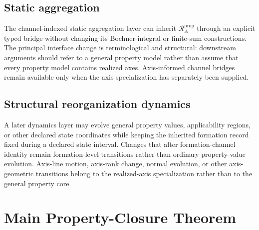 \documentclass[11pt]{article}
\newcommand{\PropRec}{\mathcal R^{\mathrm{prop}}}
\theoremstyle{definition}
\theoremstyle{remark}
\begin{document}
\subsection{Static aggregation}

The channel-indexed static aggregation layer can inherit \(\PropRec_A\) through an explicit typed bridge without changing its Bochner-integral or finite-sum constructions.
The principal interface change is terminological and structural: downstream arguments should refer to a general property model rather than assume that every property model contains realized axes.
Axis-informed channel bridges remain available only when the axis specialization has separately been supplied.

\subsection{Structural reorganization dynamics}

A later dynamics layer may evolve general property values, applicability regions, or other declared state coordinates while keeping the inherited formation record fixed during a declared state interval.
Changes that alter formation-channel identity remain formation-level transitions rather than ordinary property-value evolution.
Axis-line motion, axis-rank change, normal evolution, or other axis-geometric transitions belong to the realized-axis specialization rather than to the general property core.

\section{Main Property-Closure Theorem}
\label{sec:main-theorem}
\end{document}
